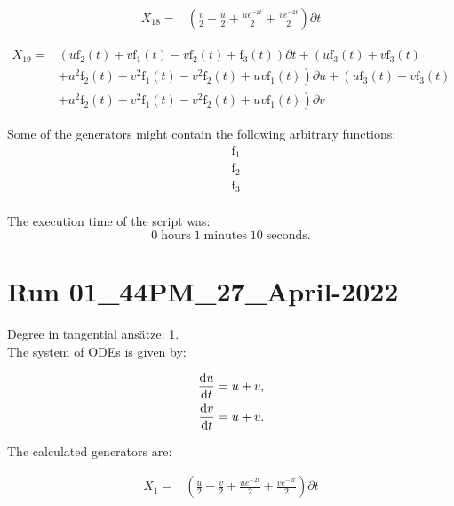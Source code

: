 \begin{align*}
X_{18}=&\left(\frac{v}{2}- \frac{u}{2}+\frac{u e^{- 2 t}}{2}+\frac{v e^{- 2 t}}{2} \right)\partial t
\end{align*}

\begin{align*}
X_{19}=&\left(u \operatorname{f_{2}}{\left(t \right)}+v \operatorname{f_{1}}{\left(t \right)}- v \operatorname{f_{2}}{\left(t \right)}+\operatorname{f_{3}}{\left(t \right)} \right)\partial t+\left(u \operatorname{f_{3}}{\left(t \right)}+v \operatorname{f_{3}}{\left(t \right)}\right.\\
&+\left.u^{2} \operatorname{f_{2}}{\left(t \right)}+v^{2} \operatorname{f_{1}}{\left(t \right)}- v^{2} \operatorname{f_{2}}{\left(t \right)}+u v \operatorname{f_{1}}{\left(t \right)} \right)\partial u+\left(u \operatorname{f_{3}}{\left(t \right)}+v \operatorname{f_{3}}{\left(t \right)}\right.\\
&+\left.u^{2} \operatorname{f_{2}}{\left(t \right)}+v^{2} \operatorname{f_{1}}{\left(t \right)}- v^{2} \operatorname{f_{2}}{\left(t \right)}+u v \operatorname{f_{1}}{\left(t \right)} \right)\partial v
\end{align*}



\noindent Some of the generators might contain the following arbitrary functions:
\begin{align*}
&\operatorname{f_{1}}\\
&\operatorname{f_{2}}\\
&\operatorname{f_{3}}\\
\end{align*}

\noindent The execution time of the script was:
$$0\;\mathrm{hours}\;1\;\mathrm{minutes}\;10 \;\mathrm{seconds}.$$
\section*{Run 01\_44PM\_27\_April-2022}
Degree in tangential ansätze:	1.\\
The system of ODEs is given by:

\begin{align*}
\dv{u}{t}&=u + v,\\
\dv{v}{t}&=u + v.\\
\end{align*}

\noindent The calculated generators are:

\begin{align*}
X_{1}=&\left(\frac{u}{2}- \frac{v}{2}+\frac{u e^{- 2 t}}{2}+\frac{v e^{- 2 t}}{2} \right)\partial t
\end{align*}

